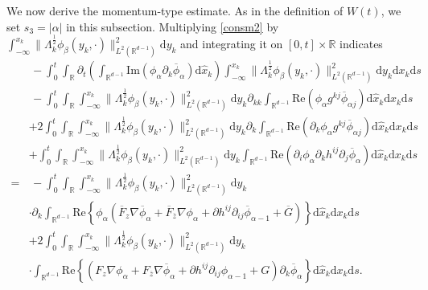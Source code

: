 \documentclass[10pt,twoside,a4paper]{article}
\numberwithin{equation}{section}\allowdisplaybreaks
\begin{document}
We now derive the momentum-type estimate. As in the definition of $ W(t) $, we set $ s_3=|\alpha| $ in this subsection. Multiplying \eqref{consm2} by $ \int_{-\infty}^{x_k} \|\Lambda_k^{\frac 12}\phi_{\beta}(y_k,\cdot)\|^2_{L^2(\mathbb{R}^{d-1})} \mathrm{d} y_k $ and integrating it on  $ [0,t]\times\mathbb{R} $ indicates
\begin{align} \label{cener_c1_1}
	&\, -\int_0^t\int_{\mathbb{R}}  \partial_t\left(\int_{\mathbb{R}^{d-1}}  \mathrm{Im}\left( \phi_{\alpha } \partial_k \overline{\phi}_\alpha \right) \mathrm{d} \hat{x}_k\right) \int_{-\infty}^{x_k} \|\Lambda_k^{\frac 12}\phi_{\beta}(y_k,\cdot)\|^2_{L^2(\mathbb{R}^{d-1})}\mathrm{d} y_k  \mathrm{d} x_k \mathrm{d} s\nonumber\\
	&\,- \int_0^t \int_{\mathbb{R}}   	\int_{-\infty}^{x_k} \|\Lambda_k^{\frac 12}\phi_{\beta}(y_k,\cdot)\|^2_{L^2(\mathbb{R}^{d-1})}\mathrm{d} y_k \partial_{kk} \int_{\mathbb{R}^{d-1}} \mathrm{Re}\left( \phi_{\alpha }   g^{kj} \overline{\phi}_{\alpha j}\right) \mathrm{d} \hat{x}_k   \mathrm{d} x_k \mathrm{d} s\nonumber \\
	&+2  \int_0^t\int_{\mathbb{R}}    	\int_{-\infty}^{x_k} \|\Lambda_k^{\frac 12}\phi_{\beta}(y_k,\cdot)\|^2_{L^2(\mathbb{R}^{d-1})}\mathrm{d} y_k \partial_k \int_{\mathbb{R}^{d-1}} \mathrm{Re}\left(\partial_k \phi_{\alpha }  g^{kj} \overline{\phi}_{\alpha j}\right) \mathrm{d} \hat{x}_k  \mathrm{d} x_k \mathrm{d} s \nonumber\\
	&+ \int_0^t	\int_{\mathbb{R}} \int_{-\infty}^{x_k} \|\Lambda_k^{\frac 12}\phi_{\beta}(y_k,\cdot)\|^2_{L^2(\mathbb{R}^{d-1})}\mathrm{d} y_k\int_{\mathbb{R}^{d-1}}  \mathrm{Re}\left(\partial_{i} \phi_{\alpha }  \partial_k h^{ij} \partial_j \overline{\phi}_{\alpha }\right) \mathrm{d} \hat{x}_k  \mathrm{d} x_k \mathrm{d} s \\
	=&\,- \int_0^t	\int_{\mathbb{R}}\int_{-\infty}^{x_k} \|\Lambda_k^{\frac 12}\phi_{\beta}(y_k,\cdot)\|^2_{L^2(\mathbb{R}^{d-1})}\mathrm{d} y_k\nonumber\\
	&\cdot \partial_k\int_{\mathbb{R}^{d-1}}   \mathrm{Re}  \left\{ \phi_{\alpha } \left(\overline{F}_z\nabla \overline{\phi}_\alpha+\overline{F}_{\overline{z}}\nabla \phi_\alpha+\partial h^{ij}\partial_{ij } \overline{\phi}_{\alpha -1}+\overline{G}\right)  \right\} \mathrm{d} \hat{x}_k  \mathrm{d} x_k \mathrm{d} s\nonumber\\
	&+2\int_0^t	\int_{\mathbb{R}} \int_{-\infty}^{x_k} \|\Lambda_k^{\frac 12}\phi_{\beta}(y_k,\cdot)\|^2_{L^2(\mathbb{R}^{d-1})}\mathrm{d} y_k\nonumber\\
	&\cdot\int_{\mathbb{R}^{d-1}} \mathrm{Re}\left\{\left( F_z\nabla \phi_\alpha+F_{\overline{z}}\nabla \overline{\phi}_\alpha+\partial h^{ij}\partial_{ij } \phi_{\alpha -1}+G\right) \partial_k \overline{\phi}_\alpha \right\}  \mathrm{d} \hat{x}_k  \mathrm{d} x_k \mathrm{d} s\nonumber.
\end{align}
\end{document}

